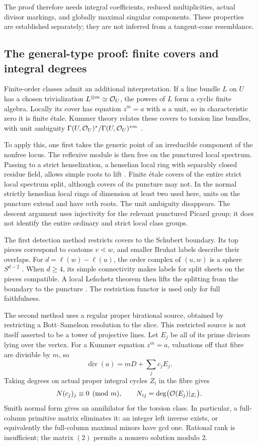 The proof therefore needs integral coefficients, reduced multiplicities, actual divisor markings, and globally maximal singular components. These properties are established separately; they are not inferred from a tangent-cone resemblance.

\subsection{The general-type proof: finite covers and integral degrees}
Finite-order classes admit an additional interpretation. If a line bundle $L$ on $U$ has a chosen trivialization $L^{\otimes m}\simeq\mathcal O_U$, the powers of $L$ form a cyclic finite algebra. Locally its cover has equation $z^m=a$ with $a$ a unit, so in characteristic zero it is finite étale. Kummer theory relates these covers to torsion line bundles, with unit ambiguity $\Gamma(U,\mathcal O_U)^*/\Gamma(U,\mathcal O_U)^{*m}$ \cite{Gro71}\cite[Tag 03PK]{The26}.

To apply this, one first takes the generic point of an irreducible component of the nonfree locus. The reflexive module is then free on the punctured local spectrum. Passing to a strict henselization, a henselian local ring with separably closed residue field, allows simple roots to lift \cite[Tag 04GE]{The26}. Finite étale covers of the entire strict local spectrum split, although covers of its puncture may not. In the normal strictly henselian local rings of dimension at least two used here, units on the puncture extend and have $m$th roots. The unit ambiguity disappears. The descent argument uses injectivity for the relevant punctured Picard group; it does not identify the entire ordinary and strict local class groups.

The first detection method restricts covers to the Schubert boundary. Its top pieces correspond to coatoms $v\lessdot w$, and smaller Bruhat labels describe their overlaps. For $d=\ell(w)-\ell(u)$, the order complex of $(u,w)$ is a sphere $S^{d-2}$ \cite{BW82}. When $d\ge4$, its simple connectivity makes labels for split sheets on the pieces compatible. A local Lefschetz theorem then lifts the splitting from the boundary to the puncture \cite[Tag 0BLJ]{The26}. The restriction functor is used only for full faithfulness.

The second method uses a regular proper birational source, obtained by restricting a Bott--Samelson resolution to the slice. This restricted source is not itself asserted to be a tower of projective lines. Let $E_j$ be all of its prime divisors lying over the vertex. For a Kummer equation $z^m=a$, valuations off that fibre are divisible by $m$, so
\[
 \operatorname{div}(a)=mD+\sum_jc_jE_j.
\]
Taking degrees on actual proper integral cycles $Z_i$ in the fibre gives
\[
 N(c_j)_j\equiv0\pmod m,
 \qquad N_{ij}=\deg\bigl(\mathcal O(E_j)|_{Z_i}\bigr).
\]
Smith normal form gives an annihilator for the torsion class. In particular, a full-column primitive matrix eliminates it: an integer left inverse exists, or equivalently the full-column maximal minors have gcd one. Rational rank is insufficient; the matrix $(2)$ permits a nonzero solution modulo $2$.

